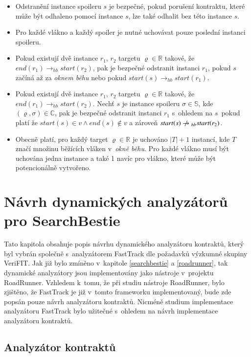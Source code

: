 \begin{itemize}
\item Odstranění instance spoileru $s$ je bezpečné, pokud porušení kontraktu, které může být odhaleno pomocí instance $s$, lze také odhalit bez této instance $s$.
\item Pro každé vlákno a každý spoiler je nutné uchovávat pouze poslední instanci spoileru. %
\item Pokud existují dvě instance $r_1$, $r_2$ targetu $\varrho \in \mathbb{R}$ takové, že $end(r_1) \rightarrow_{hb} start(r_2)$, pak je bezpečné odstranit instanci $r_1$, pokud $s$ začíná až za \textit{oknem běhu} nebo pokud $start(s) \rightarrow_{hb} start(r_1)$.%
\item Pokud existují dvě instance $r_1$, $r_2$ targetu $\varrho \in \mathbb{R}$ takové, že $end(r_1) \rightarrow_{hb} start(r_2)$. Nechť $s$ je instance spoileru $\sigma \in \mathbb{S}$, kde $(\varrho, \sigma) \in \mathbb{C}$, pak je bezpečné odstranit instanci $r_1$ s~ohledem na $s$~pokud platí že $start(s) \in v \wedge end(s) \notin v$ a zároveň $start(s) \centernot\rightarrow_{hb} start(r_2)$. %
\item Obecně platí, pro každý target $\varrho \in \mathbb{R}$ je uchováno $|T| + 1$ instancí, kde $T$ značí množinu běžících vláken v~\textit{okně běhu}. Pro každé vlákno musí být uchována jedna instance a také 1 navíc pro vlákno, které může být potencionálně vytvořeno.
\end{itemize}

\chapter{Návrh dynamických analyzátorů pro SearchBestie}

Tato kapitola obsahuje popis návrhu dynamického analyzátoru kontraktů, který byl vybrán společně s~analyzátorem FastTrack dle požadavků výzkumné skupiny VeriFIT. Jak již bylo zmíněno v~kapitole \ref{searchbestie} a \ref{roadrunner}, tak dynamické analyzátory jsou implementovány jako nástroje v~projektu RoadRunner. Vzhledem k~tomu, že při studiu nástroje RoadRunner, bylo zjištěno, že FastTrack je již v~tomto frameworku implementovaný, bude zde popsán pouze návrh analyzátoru kontraktů. Nicméně studium implementace analyzátoru FastTrack bylo užitečné s~ohledem na návrh implementace analyzátoru kontraktů.

\section{Analyzátor kontraktů}

